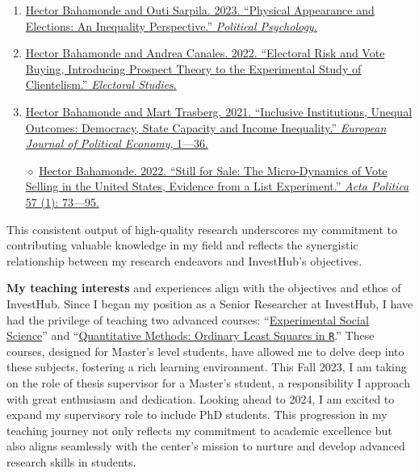 \documentclass[10pt,stdletter,dateno,sigleft]{newlfm} %
\begin{document}
\begin{newlfm}
\begin{enumerate}
  \item \href{https://doi.org/10.1111/pops.12940}{Hector Bahamonde and Outi Sarpila. 2023. ``Physical Appearance and Elections: An Inequality Perspective.'' \emph{Political Psychology}.}
  \item \href{https://doi.org/10.1016/j.electstud.2022.102497}{Hector Bahamonde and Andrea Canales. 2022. ``Electoral Risk and Vote Buying, Introducing Prospect Theory to the Experimental Study of Clientelism.'' \emph{Electoral Studies}.}
  \item \href{https://doi.org/10.1016/j.ejpoleco.2021.102048}{Hector Bahamonde and Mart Trasberg. 2021. ``Inclusive Institutions, Unequal Outcomes: Democracy, State Capacity and Income Inequality.'' \emph{European Journal of Political Economy}, 1---36.}
  \item[$\diamond$] \href{https://link.springer.com/article/10.1057/s41269-020-00174-4}{Hector Bahamonde. 2022. ``Still for Sale: The Micro-Dynamics of Vote Selling in the United States, Evidence from a List Experiment.'' \emph{Acta Politica} 57 (1): 73---95.}
\end{enumerate}

This consistent output of high-quality research underscores my commitment to contributing valuable knowledge in my field and reflects the synergistic relationship between my research endeavors and InvestHub's objectives.

{\bf My teaching interests} and experiences align with the objectives and ethos of InvestHub. Since I began my position as a Senior Researcher at InvestHub, I have had the privilege of teaching two advanced courses: ``\href{https://github.com/hbahamonde/Exp_Soc_Science/raw/main/Bahamonde_Exp_Soc_Sci.pdf}{Experimental Social Science}'' and ``\href{https://github.com/hbahamonde/OLS/raw/master/Bahamonde_OLS.pdf}{Quantitative Methods: Ordinary Least Squares in \texttt{R}}.'' These courses, designed for Master's level students, have allowed me to delve deep into these subjects, fostering a rich learning environment. This Fall 2023, I am taking on the role of thesis supervisor for a Master's student, a responsibility I approach with great enthusiasm and dedication. Looking ahead to 2024, I am excited to expand my supervisory role to include PhD students. This progression in my teaching journey not only reflects my commitment to academic excellence but also aligns seamlessly with the center's mission to nurture and develop advanced research skills in students.


\end{newlfm}
\end{document}
